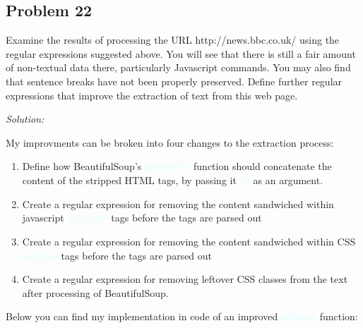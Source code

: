 \documentclass[11pt]{article}
\newenvironment{solution}{
	\vspace{10px}\noindent\emph{Solution:}
}{
	\vspace{10px}
}
\newcommand{\codeword}[1]{
	\texttt{\textcolor{lightCyan}{#1}}
}
\begin{document}
\newpage
\subsection*{Problem 22}

Examine the results of processing the URL http://news.bbc.co.uk/ using the regular expressions suggested above. You will see that there is still a fair amount of non-textual data there, particularly Javascript commands. You may also find that sentence breaks have not been properly preserved. Define further regular expressions that improve the extraction of text from this web page.

\begin{solution}
	
	My improvments can be broken into four changes to the extraction process: 
	\begin{enumerate}
		
		\item Define how BeautifulSoup's \codeword{getText()} function should concatenate the content of the stripped HTML tags, by passing it \codeword{\textbackslash n} as an argument.
		
		\item Create a regular expression for removing the content sandwiched within javascript \codeword{<script>} tags before the tags are parsed out
		
		\item Create a regular expression for removing the content sandwiched within CSS \codeword{<style>} tags before the tags are parsed out
		
		\item Create a regular expression for removing leftover CSS classes from the text after processing of BeautifulSoup.
	
	\end{enumerate}

	Below you can find my implementation in code of an improved \codeword{unknown} function:
	

\end{solution}
\end{document}
